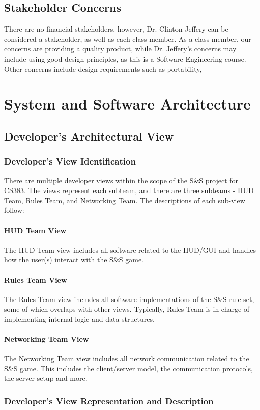 \documentclass[12pt,a4paper]{article}
\begin{document}
\subsection{Stakeholder Concerns}
There are no financial stakeholders, however, Dr. Clinton Jeffery can be considered a stakeholder, as well as each class member. As a class member, our concerns are providing a quality product, while Dr. Jeffery's concerns may include using good design principles, as this is a Software Engineering course. 
Other concerns include design requirements such as portability, 

\section{System and Software Architecture}
\subsection{Developer's Architectural View}
\subsubsection{Developer's View Identification}
There are multiple developer views within the scope of the S\&S project for CS383. The views represent each subteam, and there are three subteams - HUD Team, Rules Team, and Networking Team. The descriptions of each sub-view follow:
\paragraph{HUD Team View} The HUD Team view includes all software related to the HUD/GUI and handles how the user(s) interact with the S\&S game. 
\paragraph{Rules Team View} The Rules Team view includes all software implementations of the S\&S rule set, some of which overlaps with other views. Typically, Rules Team is in charge of implementing internal logic and data structures.
\paragraph{Networking Team View} The Networking Team view includes all network communication related to the S\&S game. This includes the client/server model, the communication protocols, the server setup and more.
\subsubsection{Developer's View Representation and Description}
\end{document}
